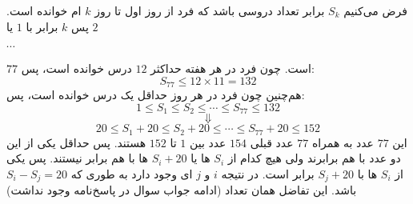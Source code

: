\p
فرض می‌کنیم
$S_k$
برابر تعداد دروسی باشد که فرد از روز اول تا روز
$k$
ام خوانده است. پس
$k$
برابر با
$1$
یا
$2$

$\cdots$

$77$
است. چون فرد در هر هفته حداکثر
$12$
درس خوانده است، پس:
$$S_{77} \leq 12 \times 11 = 132$$
هم‌چنین چون فرد در هر روز حداقل یک درس خوانده است، پس:
$$1 \leq S_1 \leq S_2 \leq \cdots \leq S_{77} \leq 132$$
$$\Downarrow$$
$$20 \leq S_1 + 20 \leq S_2 + 20 \leq \cdots \leq S_{77} + 20 \leq 152$$
این
$77$
عدد به همراه
$77$
عدد قبلی
$154$
عدد بین
$1$
تا
$152$
هستند. پس حداقل یکی از این دو عدد با هم برابرند ولی هیچ کدام از
$S_i$
ها یا
$S_i + 20$
ها با هم برابر نیستند. پس یکی از
$S_i$
ها با
$S_j + 20$
برابر است. در نتیجه
$i$
و
$j$
ای وجود دارد به طوری که
$S_i - S_j = 20$
باشد. این تفاضل همان تعداد
(ادامه جواب سوال در پاسخ‌نامه وجود نداشت)